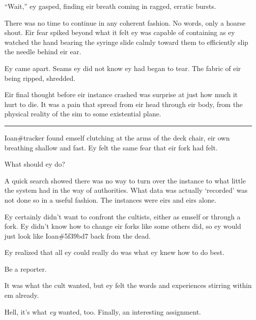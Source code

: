 ``Wait,'' ey gasped, finding eir breath coming in ragged, erratic bursts.

There was no time to continue in any coherent fashion. No words, only a hoarse shout. Eir fear spiked beyond what it felt ey was capable of containing as ey watched the hand bearing the syringe slide calmly toward them to efficiently slip the needle behind eir ear.

Ey came apart. Seams ey did not know ey had began to tear. The fabric of eir being ripped, shredded.

Eir final thought before eir instance crashed was surprise at just how much it hurt to die. It was a pain that spread from eir head through eir body, from the physical reality of the sim to some existential plane.

\begin{center}\rule{0.5\linewidth}{0.5pt}\end{center}

Ioan\#tracker found emself clutching at the arms of the deck chair, eir own breathing shallow and fast. Ey felt the same fear that eir fork had felt.

What should ey do?

A quick search showed there was no way to turn over the instance to what little the system had in the way of authorities. What data was actually `recorded' was not done so in a useful fashion. The instances were eirs and eirs alone.

Ey certainly didn't want to confront the cultists, either as emself or through a fork. Ey didn't know how to change eir forks like some others did, so ey would just look like Ioan\#5f39bd7 back from the dead.

Ey realized that all ey could really do was what ey knew how to do best.

Be a reporter.

It was what the cult wanted, but ey felt the words and experiences stirring within em already.

Hell, it's what \emph{ey} wanted, too. Finally, an interesting assignment.
